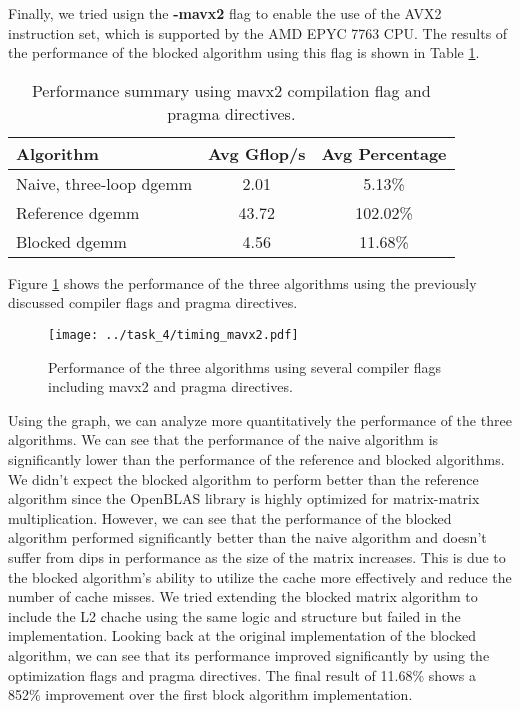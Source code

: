 \documentclass[unicode,11pt,a4paper,oneside,numbers=endperiod,openany]{scrartcl}
\begin{document}
Finally, we tried usign the \textbf{-mavx2} flag to enable the use of the AVX2 instruction set, which is supported by the
AMD EPYC 7763 CPU.
The results of the performance of the blocked algorithm using this flag is shown in 
Table \ref{tab:performance_summary_pragmas_mavx2}.
\begin{table}[htbp]
    \centering
    \caption{Performance summary using mavx2 compilation flag and pragma directives.}
    \begin{tabular}{||lcc||}
    \hline
    Algorithm & Avg Gflop/s & Avg Percentage \\
    \hline
    \hline
    Naive, three-loop dgemm & 2.01 & 5.13\% \\
    Reference dgemm & 43.72 & 102.02\% \\
    Blocked dgemm & 4.56 & 11.68\% \\
    \hline
    \end{tabular}\label{tab:performance_summary_pragmas_mavx2}
\end{table}
Figure \ref{fig:performance_mavx2} shows the performance of the three algorithms using the previously discussed compiler flags and 
pragma directives.
\begin{figure}[htbp]
    \centering
    \texttt{[image: ../task\_4/timing\_mavx2.pdf]}
    \caption{Performance of the three algorithms using several compiler flags including mavx2 and pragma directives.}
\label{fig:performance_mavx2}
\end{figure}
Using the graph, we can analyze more quantitatively the performance of the three algorithms. We can see that 
the performance of the naive algorithm is significantly lower than the performance of the reference and blocked algorithms.
We didn't expect the blocked algorithm to perform better than the reference algorithm since the OpenBLAS library is
highly optimized for matrix-matrix multiplication. However, we can see that the performance of the blocked algorithm
performed significantly better than the naive algorithm and doesn't suffer from dips in performance as the size of the 
matrix increases. This is due to the blocked algorithm's ability to utilize the cache more effectively and reduce the
number of cache misses. We tried extending the blocked matrix algorithm to include the L2 chache using the same 
logic and structure but failed in the implementation.
Looking back at the original implementation of the blocked algorithm, we can see that its performance improved significantly
by using the optimization flags and pragma directives. The final result of 11.68\% shows a 852\% improvement over the first
block algorithm implementation.
\end{document}
